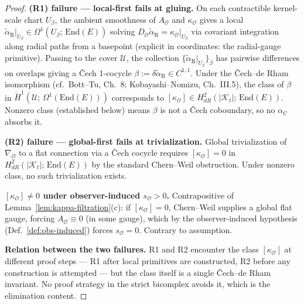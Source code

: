 \documentclass[11pt]{article}
\newcommand{\Obs}{\mathcal{O}}
\newcommand{\kappaO}{\kappa_{\Obs}}
\newcommand{\AO}{A_{\Obs}}
\newcommand{\nablaO}{\nabla_{\Obs}}
\newcommand{\DO}{D_{\Obs}}
\newcommand{\rmin}{s_{\Obs}}
\newcommand{\EE}{E}
\newcommand{\Kt}{\mathcal{K}_t}
\newcommand{\End}{\mathrm{End}}
\begin{document}
\begin{proof}
\textbf{(R1) failure --- local-first fails at gluing.}
On each contractible kernel-scale chart $U_\beta$, the ambient
smoothness of $\AO$ and $\kappaO$ gives a local
$\tilde\alpha_{\mathrm{R}}|_{U_\beta} \in \Omega^1(U_\beta;\, \End(\EE))$
solving $\DO \tilde\alpha_{\mathrm{R}} = \kappaO|_{U_\beta}$ via
covariant integration along radial paths from a basepoint
(explicit in coordinates: the radial-gauge primitive). Passing
to the cover $\mathcal{U}$, the collection
$\{\tilde\alpha_{\mathrm{R}}|_{U_\beta}\}_\beta$ has pairwise
differences on overlaps giving a \v{C}ech 1-cocycle
$\beta := \delta \tilde\alpha_{\mathrm{R}} \in C^{1,1}$. Under
the \v{C}ech--de Rham isomorphism
(cf.\ Bott--Tu, Ch.~8; Kobayashi--Nomizu, Ch.~III.5), the class
of $\beta$ in $\check{H}^1(\mathcal{U};\, \Omega^1(\End(\EE)))$
corresponds to $[\kappaO] \in H^2_{dR}(|\Kt|;\, \End(\EE))$.
Nonzero class (established below) means $\beta$ is not a
\v{C}ech coboundary, so no $\alpha_{\mathrm{C}}$ absorbs it.

\textbf{(R2) failure --- global-first fails at trivialization.}
Global trivialization of $\nablaO$ to a flat connection via a
\v{C}ech cocycle requires $[\kappaO] = 0$ in
$H^2_{dR}(|\Kt|;\, \End(\EE))$ by the standard Chern--Weil
obstruction. Under nonzero class, no such trivialization exists.

\textbf{$[\kappaO] \neq 0$ under observer-induced $\rmin > 0$.}
Contrapositive of Lemma~\ref{lem:kappa-filtration}(c): if
$[\kappaO] = 0$, Chern--Weil supplies a global flat gauge, forcing
$\AO \equiv 0$ (in some gauge), which by the observer-induced
hypothesis (Def.~\ref{def:obs-induced}) forces $\rmin = 0$.
Contrary to assumption.

\textbf{Relation between the two failures.} R1 and R2 encounter
the class $[\kappaO]$ at different proof steps --- R1 after
local primitives are constructed, R2 before any construction is
attempted --- but the class itself is a single Čech--de Rham
invariant. No proof strategy in the strict bicomplex avoids it,
which is the elimination content.
\end{proof}
\end{document}
